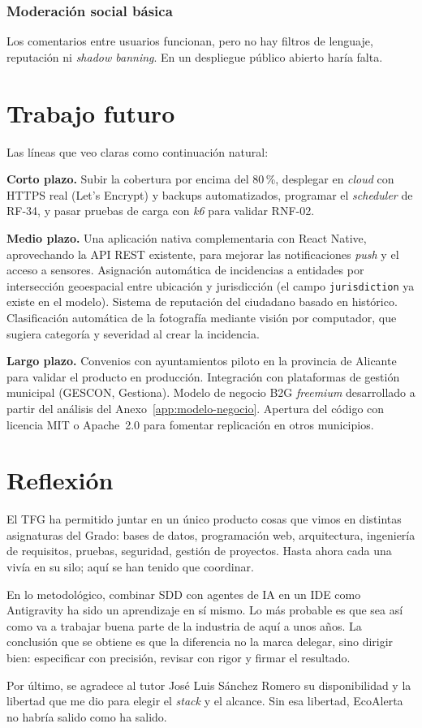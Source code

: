 \subsubsection*{Moderación social básica}
  Los comentarios entre usuarios funcionan, pero no hay filtros de lenguaje, reputación ni \textit{shadow banning}. En un despliegue público abierto haría falta.


\section{Trabajo futuro}
\label{sec:trabajo-futuro}

Las líneas que veo claras como continuación natural:

\textbf{Corto plazo.}  Subir la cobertura por encima del 80\,\%, desplegar en \textit{cloud} con HTTPS real (Let's Encrypt) y backups automatizados, programar el \textit{scheduler} de RF-34, y pasar pruebas de carga con \textit{k6} para validar RNF-02.

\textbf{Medio plazo.}  Una aplicación nativa complementaria con React Native, aprovechando la API REST existente, para mejorar las notificaciones \textit{push} y el acceso a sensores. Asignación automática de incidencias a entidades por intersección geoespacial entre ubicación y jurisdicción (el campo \texttt{jurisdiction} ya existe en el modelo). Sistema de reputación del ciudadano basado en histórico. Clasificación automática de la fotografía mediante visión por computador, que sugiera categoría y severidad al crear la incidencia.

\textbf{Largo plazo.}  Convenios con ayuntamientos piloto en la provincia de Alicante para validar el producto en producción. Integración con plataformas de gestión municipal (GESCON, Gestiona). Modelo de negocio B2G \textit{freemium} desarrollado a partir del análisis del Anexo~\ref{app:modelo-negocio}. Apertura del código con licencia MIT o Apache~2.0 para fomentar replicación en otros municipios.


\section{Reflexión}
\label{sec:reflexion}

El TFG ha permitido juntar en un único producto cosas que vimos en distintas asignaturas del Grado: bases de datos, programación web, arquitectura, ingeniería de requisitos, pruebas, seguridad, gestión de proyectos. Hasta ahora cada una vivía en su silo; aquí se han tenido que coordinar.

En lo metodológico, combinar SDD con agentes de IA en un IDE como Antigravity ha sido un aprendizaje en sí mismo. Lo más probable es que sea así como va a trabajar buena parte de la industria de aquí a unos años. La conclusión que se obtiene es que la diferencia no la marca delegar, sino dirigir bien: especificar con precisión, revisar con rigor y firmar el resultado.

Por último, se agradece al tutor José Luis Sánchez Romero su disponibilidad y la libertad que me dio para elegir el \textit{stack} y el alcance. Sin esa libertad, EcoAlerta no habría salido como ha salido.
